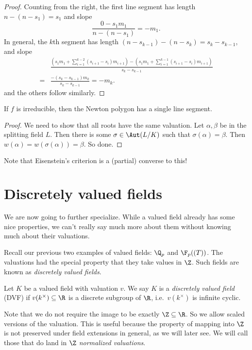 \documentclass[a4paper]{article}
\begin{document}
\begin{proof}
  Counting from the right, the first line segment has length $n - (n - s_1) = s_1$ and slope
  \[
    \frac{0 - s_1 m_1}{n - (n - s_1)} = -m_1.
  \]
  In general, the $k$th segment has length $(n - s_{k - 1}) - (n - s_k) = s_k - s_{k - 1}$, and slope
  \begin{align*}
    &\frac{\left(s_1 m_1 + \sum_{i = 1}^{k - 2} (s_{i + 1} - s_i) m_{i + 1}\right) - \left(s_1 m_1 + \sum_{i = 1}^{k - 1} (s_{i + 1} - s_i) m_{i + 1}\right)}{s_k - s_{k - 1}} \\
    ={}& \frac{-(s_k - s_{k - 1})m_k}{s_k - s_{k - 1}} = - m_k.
  \end{align*}
  and the others follow similarly.
\end{proof}

\begin{cor}
  If $f$ is irreducible, then the Newton polygon has a single line segment.
\end{cor}

\begin{proof}
  We need to show that all roots have the same valuation. Let $\alpha, \beta$ be in the splitting field $L$. Then there is some $\sigma \in \Aut(L/K)$ such that $\sigma(\alpha) = \beta$. Then $w(\alpha) = w(\sigma(\alpha)) = \beta$. So done.
\end{proof}

Note that Eisenstein's criterion is a (partial) converse to this!

\section{Discretely valued fields}
We are now going to further specialize. While a valued field already has some nice properties, we can't really say much more about them without knowing much about their valuations.

Recall our previous two examples of valued fields: $\Q_p$ and $\F_p((T))$. The valuations had the special property that they take values in $\Z$. Such fields are known as \emph{discretely valued fields}.

\begin{defi}
  Let $K$ be a valued field with valuation $v$. We say $K$ is a \emph{discretely valued field} (DVF) if $v(k^\times) \subseteq \R$ is a discrete subgroup of $\R$, i.e.\ $v(k^\times)$ is infinite cyclic.
\end{defi}
Note that we do not require the image to be exactly $\Z \subseteq \R$. So we allow scaled versions of the valuation. This is useful because the property of mapping into $\Z$ is not preserved under field extensions in general, as we will later see. We will call those that do land in $\Z$ \emph{normalized valuations}.
\end{document}
